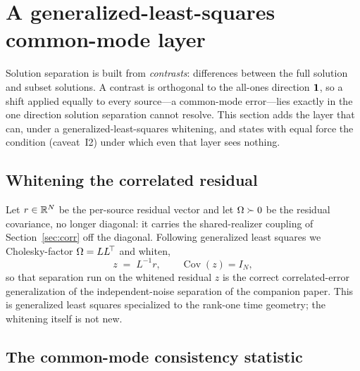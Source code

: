 \section{A generalized-least-squares common-mode layer}
\label{sec:gls}

Solution separation is built from \emph{contrasts}: differences between the full
solution and subset solutions. A contrast is orthogonal to the all-ones direction
$\bm 1{}$, so a shift applied equally to every source---a common-mode error---lies
exactly in the one direction solution separation cannot resolve. This section adds
the layer that can, under a generalized-least-squares whitening, and states with
equal force the condition (caveat~I2) under which even that layer sees nothing.

\subsection{Whitening the correlated residual}
\label{sec:whiten}

Let $r\in\mathbb{R}^N$ be the per-source residual vector and let $\Omega{}\succ0$ be the
residual covariance, no longer diagonal: it carries the shared-realizer coupling
of Section~\ref{sec:corr} off the diagonal. Following generalized least squares
\citep{aitken1935} we Cholesky-factor $\Omega{}=LL^{\!\top}$ and whiten,
\begin{equation}
  z \;=\; L^{-1} r,
  \qquad \operatorname{Cov}(z)=I_N,
  \label{eq:whiten}
\end{equation}
so that separation run on the whitened residual $z$ is the correct correlated-error
generalization of the independent-noise separation of the companion paper. This is
\Cited{} generalized least squares specialized to the rank-one time geometry; the
whitening itself is not new.

\subsection{The common-mode consistency statistic}
\label{sec:cmstat}

